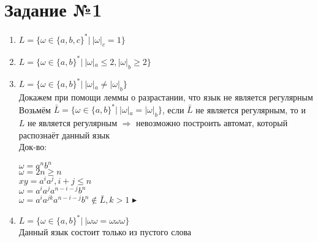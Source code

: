 \documentclass{article}
\begin{document}
\section*{\huge{Задание №1}}

    \begin{enumerate}
        \LARGE
        \item $L = \{ \omega \in \{a,b,c\}^*| \ |\omega|_c=1 \}$ \\

            \begin{center}
            \end{center}

        \item $L = \{ \omega \in \{a,b\}^*| \ |\omega|_a \leq 2, |\omega|_b \geq 2 \}$ \\

            \begin{center}
            \end{center}
            
        \newpage
        \item $L = \{ \omega \in \{a,b\}^*| \ |\omega|_a \neq |\omega|_b \}$ \\
            
            Докажем при помощи леммы о разрастании, что язык не является регулярным \\
            
            Возьмём $\bar L = \{ \omega \in \{a,b\}^*| \ |\omega|_a = |\omega|_b \}$, если $\bar L$
            не является регулярным, то и $L$ не является регулярным $\Rightarrow$ невозможно построить автомат, который
            распознаёт данный язык \\
            
            Док-во:
            \begin{center}
                $\omega = a^nb^n$ \\
                $\omega = 2n \geq n$ \\
                $xy = a^i a^j, i + j \leq n$ \\
                $\omega =  a^i a^j a^{n-i-j} b^n$\\
                $\omega = a^i a^{jk} a^{n-i-j}b^n \notin \bar L, k > 1$ $\blacktriangleright$ \\
                
            \end{center}
            
        \item $L = \{ \omega \in \{a,b\}^*| \ | \omega\omega = \omega\omega\omega \}$ \\
            Данный язык состоит только из пустого слова
            \begin{center}
            \end{center}

    \end{enumerate}
\end{document}
